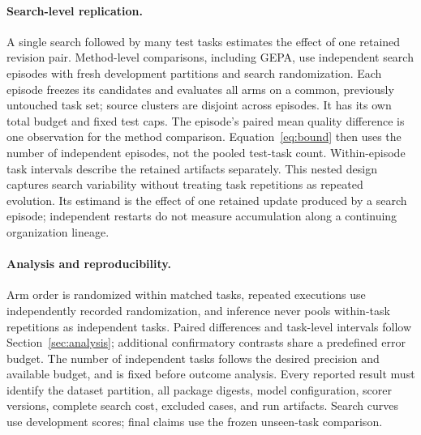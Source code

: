 \paragraph{Search-level replication.}
A single search followed by many test tasks estimates the effect of one retained revision pair. Method-level comparisons, including GEPA, use independent search episodes with fresh development partitions and search randomization. Each episode freezes its candidates and evaluates all arms on a common, previously untouched task set; source clusters are disjoint across episodes. It has its own total budget and fixed test caps. The episode's paired mean quality difference is one observation for the method comparison. Equation~\ref{eq:bound} then uses the number of independent episodes, not the pooled test-task count. Within-episode task intervals describe the retained artifacts separately. This nested design captures search variability without treating task repetitions as repeated evolution. Its estimand is the effect of one retained update produced by a search episode; independent restarts do not measure accumulation along a continuing organization lineage.

\paragraph{Analysis and reproducibility.}
Arm order is randomized within matched tasks, repeated executions use independently recorded randomization, and inference never pools within-task repetitions as independent tasks. Paired differences and task-level intervals follow Section~\ref{sec:analysis}; additional confirmatory contrasts share a predefined error budget. The number of independent tasks follows the desired precision and available budget, and is fixed before outcome analysis. Every reported result must identify the dataset partition, all package digests, model configuration, scorer versions, complete search cost, excluded cases, and run artifacts. Search curves use development scores; final claims use the frozen unseen-task comparison.
